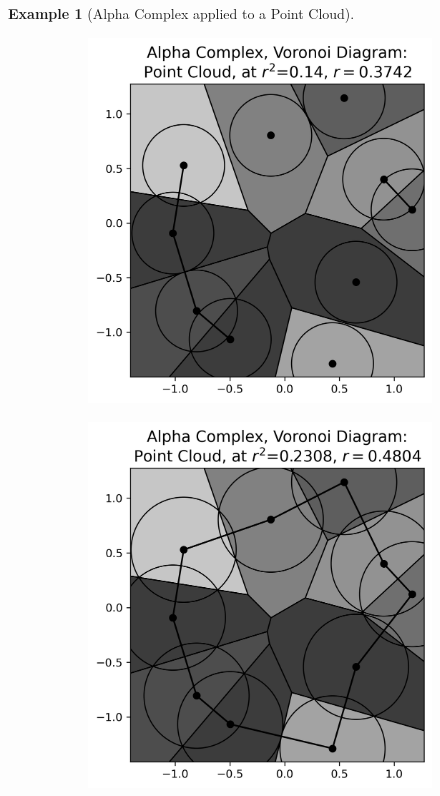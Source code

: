 \documentclass[ma]{uncgdissertationexp}
\theoremstyle{plain}
\theoremstyle{definition}
\newtheorem{example}[theorem]{Example}
\theoremstyle{remark}
\begin{document}
\begin{example}[Alpha Complex applied to a Point Cloud]
\begin{figure}[H]
\begin{subfigure}[b]{0.26\textwidth}
    \end{subfigure}
    \begin{subfigure}[b]{0.26\textwidth}
        \includegraphics[width=\textwidth]{point_cloud_plot_alpha_1.png}
    \end{subfigure}
    \begin{subfigure}[b]{0.26\textwidth}
        \includegraphics[width=\textwidth]{point_cloud_plot_alpha_2.png}

\end{subfigure}
\end{figure}
\end{example}
\end{document}
